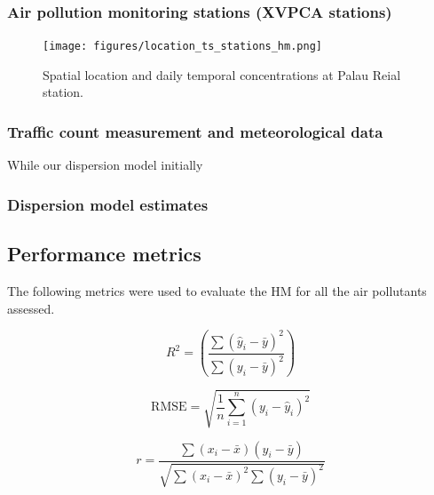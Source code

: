 \documentclass{article}
\begin{document}
\subsubsection{Air pollution monitoring stations (XVPCA stations)}
\captionsetup[figure]{skip=6pt} %
\begin{figure}[!htb]
    \centering
    \texttt{[image: figures/location\_ts\_stations\_hm.png]} %
    \caption{Spatial location and daily temporal concentrations at Palau Reial station.}
    \label{FigureS1} %
\end{figure}

\subsubsection{Traffic count measurement and meteorological data}
While our dispersion model initially 

\subsubsection{Dispersion model estimates}

\subsection{Performance metrics}
The following metrics were used to evaluate the HM for all the air pollutants assessed. 

\begin{equation}
R^2 = \left( \frac{\sum (\hat{y}_i - \bar{y})^2}{\sum (y_i - \bar{y})^2} \right)
\end{equation}

\begin{equation}
\text{RMSE} = \sqrt{\frac{1}{n} \sum_{i=1}^{n} (y_i - \hat{y}_i)^2}
\end{equation}

\begin{equation}
r = \frac{\sum (x_i - \bar{x})(y_i - \bar{y})}{\sqrt{\sum (x_i - \bar{x})^2 \sum (y_i - \bar{y})^2}}
\end{equation}
\vspace{0.5 cm}
\end{document}

